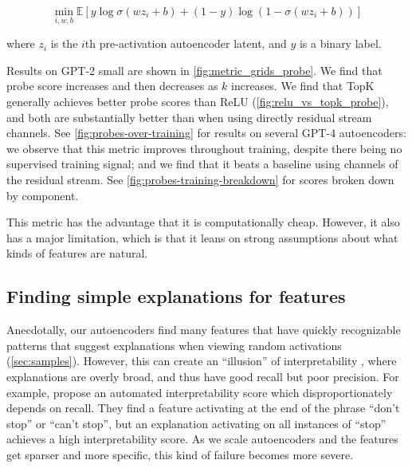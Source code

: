 \begin{equation}
    \min_{i,w,b} \mathbb E \left[ y \log \sigma \left(wz_i + b \right) + \left(1 - y \right) \log \left(1 - \sigma \left(wz_i + b \right) \right) \right]
\end{equation}

where $z_i$ is the $i$th pre-activation autoencoder latent, and $y$ is a binary label. 

Results on GPT-2 small are shown in \autoref{fig:metric_grids_probe}.  We find that probe score increases and then decreases as $k$ increases. We find that TopK generally achieves better probe scores than ReLU (\autoref{fig:relu_vs_topk_probe}), and both are substantially better 
than when using directly residual stream channels. See \autoref{fig:probes-over-training} for results on several GPT-4 autoencoders: we observe that this metric improves throughout training, despite there being no supervised training signal; and we find that it beats a baseline using channels of the residual stream. See \autoref{fig:probes-training-breakdown} for scores broken down by component.

This metric has the advantage that it is computationally cheap. However, it also has a major limitation, which is that it leans on strong assumptions about what kinds of features are natural.


\subsection{Finding simple explanations for features}
\label{sec:explanations}

Anecdotally, our autoencoders find many features that have quickly recognizable patterns that suggest explanations when viewing random activations (\autoref{sec:samples}). %
However, this can create an ``illusion'' of interpretability \citep{bolukbasi2021interpretability}, where explanations are overly broad, and thus have good recall but poor precision.
For example, \citet{bills2023language} propose an automated interpretability score which disproportionately depends on recall.  They find a feature activating at the end of the phrase ``don't stop'' or ``can't stop'', but an explanation activating on all instances of ``stop'' achieves a high interpretability score. As we scale autoencoders and the features get sparser and more specific, this kind of failure becomes more severe.








